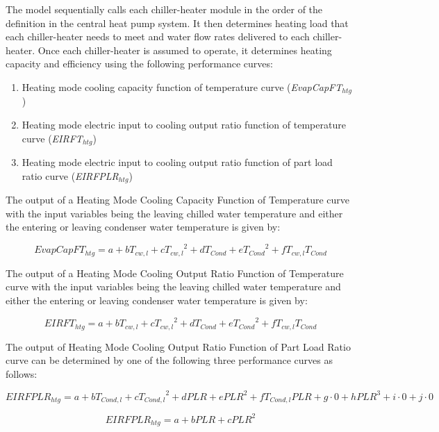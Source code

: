The model sequentially calls each chiller-heater module in the order of the definition in the central heat pump system. It then determines heating load that each chiller-heater needs to meet and water flow rates delivered to each chiller-heater. Once each chiller-heater is assumed to operate, it determines heating capacity and efficiency using the following performance curves:

\begin{enumerate}
\item Heating mode cooling capacity function of temperature curve (\emph{EvapCapFT\(_{htg}\)})
\item Heating mode electric input to cooling output ratio function of temperature curve (\emph{EIRFT\(_{htg}\)})
\item Heating mode electric input to cooling output ratio function of part load ratio curve (\emph{EIRFPLR\(_{htg}\)})
\end{enumerate}

The output of a Heating Mode Cooling Capacity Function of Temperature curve with the input variables being the leaving chilled water temperature and either the entering or leaving condenser water temperature is given by:

\begin{equation}
EvapCapF{T_{htg}} = a + b{T_{cw,l}} + c{T_{cw,l}}^2 + d{T_{Cond}} + e{T_{Cond}}^2 + f{T_{cw,l}}{T_{Cond}}
\end{equation}

The output of a Heating Mode Cooling Output Ratio Function of Temperature curve with the input variables being the leaving chilled water temperature and either the entering or leaving condenser water temperature is given by:

\begin{equation}
EIRF{T_{htg}} = a + b{T_{cw,l}} + c{T_{cw,l}}^2 + d{T_{Cond}} + e{T_{Cond}}^2 + f{T_{cw,l}}{T_{Cond}}
\end{equation}

The output of Heating Mode Cooling Output Ratio Function of Part Load Ratio curve can be determined by one of the following three performance curves as follows:

\begin{equation}
EIRFPL{R_{htg}} = a + b{T_{Cond,l}} + c{T_{Cond,l}}^2 + dPLR + ePL{R^2} + f{T_{Cond,l}}PLR + g \cdot 0 + hPL{R^3} + i \cdot 0 + j \cdot 0
\end{equation}

\begin{equation}
EIRFPL{R_{htg}} = a + bPLR + cPL{R^2}
\end{equation}

